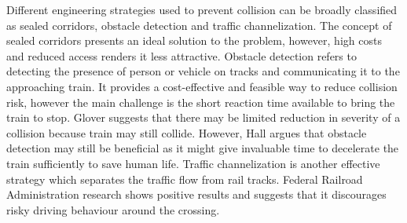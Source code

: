 Different engineering strategies used to prevent collision can be broadly classified as sealed corridors, obstacle detection and traffic channelization\cite{chadwick2014highway}. The concept of sealed corridors presents an ideal solution to the problem, however, high costs and reduced access renders it less attractive. Obstacle detection refers to detecting the presence of person or vehicle on tracks and communicating it to the approaching train\cite{glover09}. It provides a cost-effective and feasible way to reduce collision risk, however the main challenge is the short reaction time available to bring the train to stop. Glover\cite{glover09} suggests that there may be limited reduction in severity of a collision because train may still collide. However, Hall\cite{hall2007reducing} argues that obstacle detection may still be beneficial as it might give invaluable time to decelerate the train sufficiently to save human life. Traffic channelization is another effective strategy which separates the traffic flow from rail tracks. Federal Railroad Administration research shows positive results and suggests that it discourages risky driving behaviour around the crossing\cite{horton2012use}. 



